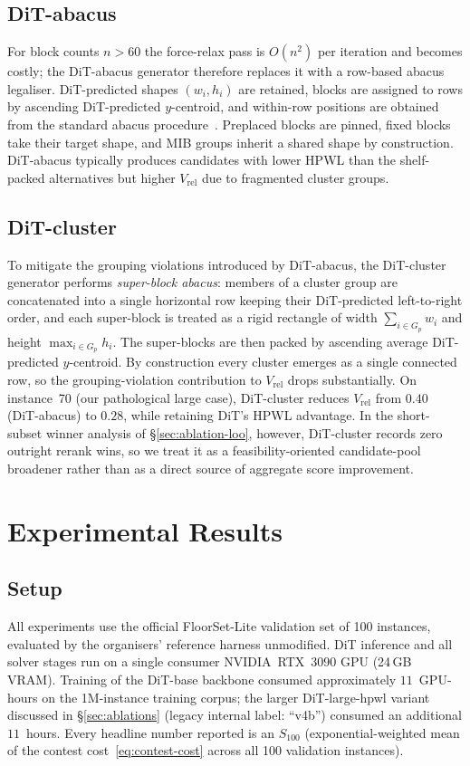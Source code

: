 \documentclass[nolineno]{ieeeaccess}
\begin{document}
\subsection{DiT-abacus}
For block counts $n > 60$ the force-relax pass is $O(n^2)$ per
iteration and becomes costly; the DiT-abacus generator therefore
replaces it with a row-based abacus legaliser. DiT-predicted shapes
$(w_i, h_i)$ are retained, blocks are assigned to rows by ascending
DiT-predicted $y$-centroid, and within-row positions are obtained from
the standard abacus procedure~\cite{spindler2008abacus}. Preplaced blocks
are pinned, fixed blocks take their target shape, and MIB groups
inherit a shared shape by construction. DiT-abacus typically produces
candidates with lower HPWL than the shelf-packed alternatives but
higher $V_{\text{rel}}$ due to fragmented cluster groups.

\subsection{DiT-cluster}
To mitigate the grouping violations introduced by DiT-abacus, the
DiT-cluster generator performs \emph{super-block abacus}: members of a
cluster group are concatenated into a single horizontal row keeping
their DiT-predicted left-to-right order, and each super-block is
treated as a rigid rectangle of width $\sum_{i\in G_p} w_i$ and height
$\max_{i\in G_p} h_i$. The super-blocks are then packed by ascending
average DiT-predicted $y$-centroid. By construction every cluster
emerges as a single connected row, so the grouping-violation
contribution to $V_{\text{rel}}$ drops substantially. On instance~70 (our
pathological large case), DiT-cluster reduces $V_{\text{rel}}$ from $0.40$
(DiT-abacus) to $0.28$, while retaining DiT's HPWL advantage. In the
short-subset winner analysis of \S\ref{sec:ablation-loo}, however,
DiT-cluster records zero outright rerank wins, so we treat it as a
feasibility-oriented candidate-pool broadener rather than as a direct
source of aggregate score improvement.

\section{Experimental Results}
\label{sec:experiments}

\subsection{Setup}
All experiments use the official FloorSet-Lite validation
set of 100 instances, evaluated by the organisers' reference harness
unmodified. DiT inference and all solver stages run on a single
consumer NVIDIA~RTX~3090 GPU (24\,GB VRAM). Training of the DiT-base
backbone consumed approximately $11$~GPU-hours on the 1M-instance
training corpus; the larger DiT-large-hpwl variant discussed in
\S\ref{sec:ablations} (legacy internal label: ``v4b'') consumed an
additional $11$~hours. Every headline number reported is
an $S_{100}$ (exponential-weighted mean of the contest
cost~\eqref{eq:contest-cost} across all 100 validation instances).
\end{document}
